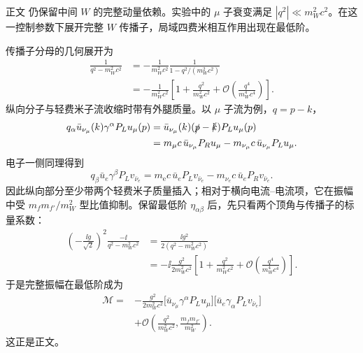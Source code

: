 \begin{derivation}[低能带电流中的虚矢量消元]
正文 仍保留中间 $W$ 的完整动量依赖。实验中的 $\mu$ 子衰变满足 $|q^2|\ll m_W^2c^2$。在这一控制参数下展开完整 $W$ 传播子，局域四费米相互作用出现在最低阶。

传播子分母的几何展开为
\begin{align*}
\frac{1}{q^2-m_W^2c^2}
&=-\frac{1}{m_W^2c^2}\frac{1}{1-q^2/(m_W^2c^2)}\\
&=-\frac{1}{m_W^2c^2}
\left[1+\frac{q^2}{m_W^2c^2}
+\mathcal O\!\left(\frac{q^4}{m_W^4c^4}\right)\right].
\end{align*}
纵向分子与轻费米子流收缩时带有外腿质量。以 $\mu$ 子流为例，$q=p-k$，
\begin{align*}
q_\alpha\bar u_{\nu_\mu}(k)\gamma^\alpha P_Lu_\mu(p)
&=\bar u_{\nu_\mu}(k)(\slashed p-\slashed k)P_Lu_\mu(p)\\
&=m_\mu c\,\bar u_{\nu_\mu}P_Ru_\mu
-m_{\nu_\mu}c\,\bar u_{\nu_\mu}P_Lu_\mu.
\end{align*}
电子一侧同理得到
\begin{equation*}
q_\beta\bar u_e\gamma^\beta P_Lv_{\bar\nu_e}
=m_{\mathrm e} c\,\bar u_eP_Lv_{\bar\nu_e}
-m_{\nu_e}c\,\bar u_eP_Rv_{\bar\nu_e}.
\end{equation*}
因此纵向部分至少带两个轻费米子质量插入；相对于横向电流--电流项，它在振幅中受 $m_fm_{f'}/m_W^2$ 型比值抑制。保留最低阶 $\eta_{\alpha\beta}$ 后，先只看两个顶角与传播子的标量系数：
\begin{align*}
\left(-\frac{\ii g}{\sqrt2}\right)^2
\frac{-\ii}{q^2-m_W^2c^2}
&=\frac{\ii g^2}{2(q^2-m_W^2c^2)}\\
&=-\ii\frac{g^2}{2m_W^2c^2}
\left[1+\frac{q^2}{m_W^2c^2}
+\mathcal O\!\left(\frac{q^4}{m_W^4c^4}\right)\right].
\end{align*}
于是完整振幅在最低阶成为
\begin{align*}
\mathcal M
={}&-\frac{g^2}{2m_W^2c^2}
\bigl[\bar u_{\nu_\mu}\gamma^\alpha P_Lu_\mu\bigr]
\bigl[\bar u_e\gamma_\alpha P_Lv_{\bar\nu_e}\bigr]\\
&+\mathcal O\!\left(
\frac{q^2}{m_W^2c^2},
\frac{m_fm_{f'}}{m_W^2}
\right).
\end{align*}
这正是正文。
\end{derivation}

